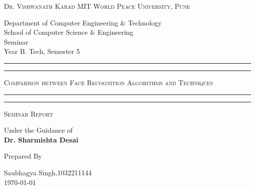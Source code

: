 \documentclass[openany]{report}
\begin{document}
\begin{titlepage}
    \centering


    \huge\textsc{
        Dr. Vishwanath Karad MIT World Peace University, Pune
    }\\

    \vspace{0.75\baselineskip} %

    \LARGE{
        Department of Computer Engineering \& Technology \\
        School of Computer Science \& Engineering\\
        Seminar\\
        Year B. Tech, Semester 5\\
    }

    \vfill %


    \rule{\textwidth}{1.6pt}\vspace*{-\baselineskip}\vspace*{2pt}
    \rule{\textwidth}{0.6pt}
    \vspace{0.75\baselineskip} %



    \huge{\textsc{
            Comparison between Face Recognition Algorithms and Techniques
        }} \\



    \vspace{0.5\baselineskip} %
    \rule{\textwidth}{0.6pt}\vspace*{-\baselineskip}\vspace*{2.8pt}
    \rule{\textwidth}{1.6pt}

    \vspace{1\baselineskip} %


    \LARGE\textsc{
        Seminar Report
    } %


    \vspace{0.5\baselineskip} %
    Under the Guidance of\\
    \Large{
        \textbf{Dr. Sharmishta Desai}
    }
    \vfill

    Prepared By
    \vspace{0.5\baselineskip} %

    \Large{
        Saubhagya Singh,1032211144\\
    }
    \vspace{0.5\baselineskip} %
    \today

\end{titlepage}
\end{document}
